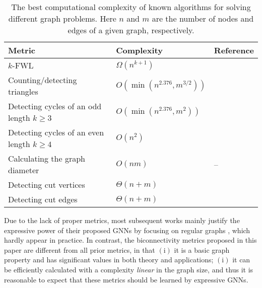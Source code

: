 \documentclass{article} %
\begin{document}
\begin{table}[h]
    \vspace{-8pt}
    \centering
    \small
    \caption{The best computational complexity of known algorithms for solving different graph problems. Here $n$ and $m$ are the number of nodes and edges of a given graph, respectively. }
    \label{tab:complexity}
    \vspace{2pt}
    \begin{tabular}{lll}
    \toprule
    Metric & Complexity & Reference\\
    \midrule
    $k$-FWL & $\Omega(n^{k+1})$ &\citep{immerman1990describing}\\
    Counting/detecting triangles & $O(\min(n^{2.376},m^{3/2}))$ &\citep{alon1997finding}\\
    Detecting cycles of an odd length $k\ge 3$ & $O(\min(n^{2.376},m^2))$ &\citep{alon1997finding}\\
    Detecting cycles of an even length $k\ge 4$ & $O(n^2)$ &\citep{yuster1997finding}\\
    Calculating the graph diameter & $O(nm)$ & --\\
    \midrule
    Detecting cut vertices & $\Theta(n+m)$ &\citep{tarjan1972depth}\\
    Detecting cut edges & $\Theta(n+m)$ &\citep{tarjan1972depth}\\
    \bottomrule
    \end{tabular}
\end{table}

Due to the lack of proper metrics, most subsequent works mainly justify the expressive power of their proposed GNNs by focusing on regular graphs \citep[to list a few]{li2020distance,bevilacqua2022equivariant,bodnar2021topological,feng2022powerful,velingker2022affinity}, which hardly appear in practice. In contrast, the biconnectivity metrics proposed in this paper are different from all prior metrics, in that $(\mathrm{i})$ it is a basic graph property and has significant values in both theory and applications; $(\mathrm{i})$ it can be efficiently calculated with a complexity \emph{linear} in the graph size, and thus it is reasonable to expect that these metrics should be learned by expressive GNNs.
\end{document}
